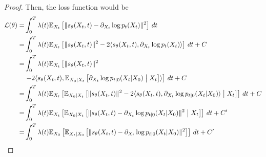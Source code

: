 \documentclass[11pt, a4paper]{article}
\newtheorem{theorem}{Theorem}
\begin{document}
\begin{proof}
Then, the loss function would be
\begin{align}
    \cL(\theta) =& \int_0^T \lambda(t) \fE_{X_t}\left[ \| s_\theta(X_t, t)  - \partial_{X_t} \log p_t(X_t)\|^2 \right]\, dt\\
    =& \int_0^T \lambda(t) \fE_{X_t}\left[ \| s_\theta(X_t, t) \|^2  - 2 \langle s_\theta(X_t, t), \partial_{X_t} \log p_t(X_t)\rangle \right]\, dt + C\\
    =& \int_0^T \lambda(t) \fE_{X_t}\left[ \| s_\theta(X_t, t) \|^2 \right. \nonumber\\
    &\left.- 2 \langle s_\theta(X_t, t), \fE_{X_0|X_t}\left[\partial_{X_t}  \log p_{t|0}(X_t|X_0)\suchthat X_t\right] \rangle \right]\, dt + C\\
    =& \int_0^T \lambda(t) \fE_{X_t}\left[ \fE_{X_0|X_t}\left[ \| s_\theta(X_t, t) \|^2 
    - 2 \langle s_\theta(X_t, t), \partial_{X_t}  \log p_{t|0}(X_t|X_0) \rangle \suchthat X_t\right]\right]\, dt + C\\
    =& \int_0^T \lambda(t) \fE_{X_t}\left[\fE_{X_0|X_t}\left[ \| s_\theta(X_t, t)  - \partial_{X_t} \log p_{t|0}(X_t|X_0)\|^2 \suchthat X_t\right]\right]\, dt + C'\\
    =& \int_0^T \lambda(t) \fE_{X_0}\left[\fE_{X_t|X_0}\left[ \| s_\theta(X_t, t)  - \partial_{X_t} \log p_{t|0}(X_t|X_0)\|^2 \right]\right]\, dt + C'
\end{align}
\end{proof}


\end{document}
